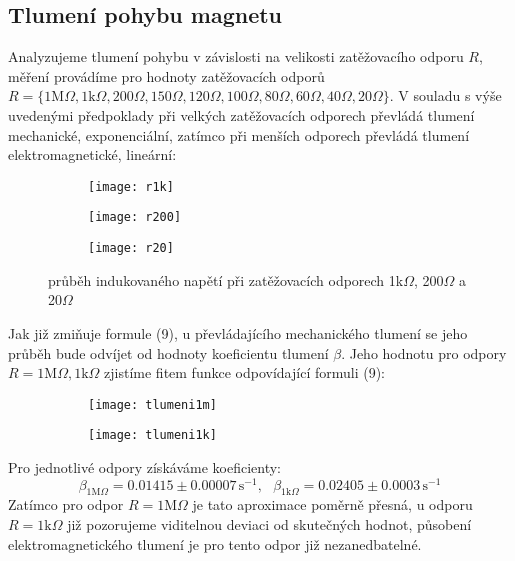 \documentclass[czech,11pt,a4paper]{article}
\begin{document}
   \subsection{Tlumení pohybu magnetu}
   Analyzujeme tlumení pohybu v závislosti na velikosti zatěžovacího odporu $R$, měření provádíme pro hodnoty zatěžovacích odporů $R = \{1\mathrm{M} \Omega, 1\mathrm{k}\Omega, 200\Omega, 150\Omega, 120\Omega, 100\Omega, 80\Omega, 60\Omega, 40\Omega, 20\Omega \}$. V souladu s výše uvedenými předpoklady při velkých zatěžovacích odporech převládá tlumení mechanické, exponenciální, zatímco při menších odporech převládá tlumení elektromagnetické, lineární:
    \begin{figure}[H]
   	\begin{subfigure}{0.33\textwidth}
   		\texttt{[image: r1k]} 
   	\end{subfigure}
   	\begin{subfigure}{0.33\textwidth}
   			\texttt{[image: r200]} 
   	\end{subfigure}
   	\begin{subfigure}{0.33\textwidth}
   			\texttt{[image: r20]}				
   		
   \end{subfigure}	\caption{průběh indukovaného napětí při zatěžovacích odporech 1k$\Omega$, 200$\Omega$ a 20$\Omega$} \end{figure}
	Jak již zmiňuje formule (9), u převládajícího mechanického tlumení se jeho průběh bude odvíjet od hodnoty koeficientu tlumení $\beta$. Jeho hodnotu pro odpory $R = 1\mathrm{M}\Omega, 1\mathrm{k}\Omega$ zjistíme fitem funkce odpovídající formuli (9):
	
	\begin{figure}[H]
		\begin{subfigure}{0.5\textwidth}
			\texttt{[image: tlumeni1m]} 
		\end{subfigure}
		\begin{subfigure}{0.5\textwidth}
			\texttt{[image: tlumeni1k]}		
	\end{subfigure} \end{figure} 
	Pro jednotlivé odpory získáváme koeficienty:
	\begin{equation*}
		\beta_{1\mathrm{M}\Omega} = 0.01415 \pm 0.00007\,\mathrm{s}^{-1}, \,\,\,\, \beta_{1\mathrm{k}\Omega} = 0.02405 \pm 0.0003\,\mathrm{s}^{-1}
	\end{equation*}
	Zatímco pro odpor $R = 1\mathrm{M}\Omega$ je tato aproximace poměrně přesná, u odporu $R = 1 \mathrm{k}\Omega$ již pozorujeme viditelnou deviaci od skutečných hodnot, působení elektromagnetického tlumení je pro tento odpor již nezanedbatelné.
	
\end{document}
